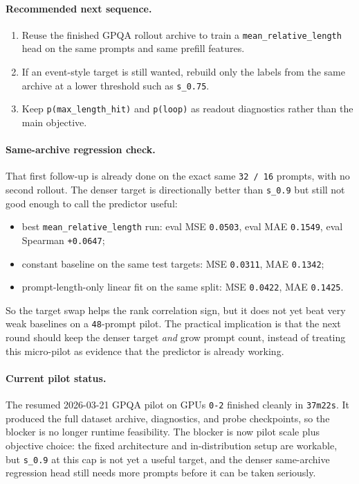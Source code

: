 \documentclass[11pt]{article}
\begin{document}
\paragraph{Recommended next sequence.}
\begin{enumerate}[leftmargin=1.5em]
\item Reuse the finished GPQA rollout archive to train a \texttt{mean\_relative\_length}
head on the same prompts and same prefill features.
\item If an event-style target is still wanted, rebuild only the labels from the
same archive at a lower threshold such as \texttt{s\_0.75}.
\item Keep \texttt{p(max\_length\_hit)} and \texttt{p(loop)} as readout
diagnostics rather than the main objective.
\end{enumerate}

\paragraph{Same-archive regression check.}
That first follow-up is already done on the exact same \texttt{32 / 16} prompts,
with no second rollout. The denser target is directionally better than
\texttt{s\_0.9} but still not good enough to call the predictor useful:
\begin{itemize}[leftmargin=1.5em]
\item best \texttt{mean\_relative\_length} run: eval MSE \texttt{0.0503}, eval
MAE \texttt{0.1549}, eval Spearman \texttt{+0.0647};
\item constant baseline on the same test targets: MSE \texttt{0.0311}, MAE
\texttt{0.1342};
\item prompt-length-only linear fit on the same split: MSE \texttt{0.0422}, MAE
\texttt{0.1425}.
\end{itemize}
So the target swap helps the rank correlation sign, but it does not yet beat
very weak baselines on a \texttt{48}-prompt pilot. The practical implication is
that the next round should keep the denser target \emph{and} grow prompt count,
instead of treating this micro-pilot as evidence that the predictor is already
working.

\paragraph{Current pilot status.}
The resumed 2026-03-21 GPQA pilot on GPUs \texttt{0-2} finished cleanly in
\texttt{37m22s}. It produced the full dataset archive, diagnostics, and probe
checkpoints, so the blocker is no longer runtime feasibility. The blocker is now
pilot scale plus objective choice: the fixed architecture and in-distribution
setup are workable, but \texttt{s\_0.9} at this cap is not yet a useful target,
and the denser same-archive regression head still needs more prompts before it
can be taken seriously.
\end{document}
